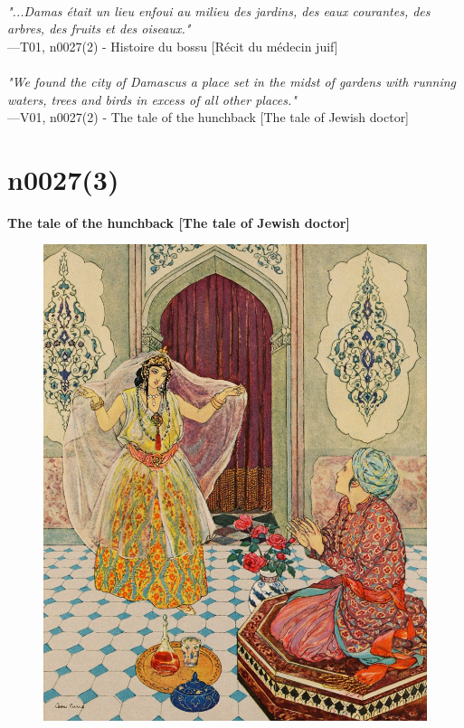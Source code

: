 \documentclass[../Carre_nights.tex]{subfiles}
\begin{document}
\textit{\\
"...Damas était un lieu enfoui au milieu des jardins, des eaux courantes, des arbres, des fruits et des oiseaux."} \\
—T01, n0027(2) - Histoire du bossu [Récit du médecin juif] \\~\\
\textit{"We found the city of Damascus a place set in the midst of gardens with running waters, trees and birds in excess of all other places."} \\
—V01, n0027(2) - The tale of the hunchback [The tale of Jewish doctor]

\newpage

\section{n0027(3)}
\textbf{\Large{The tale of the hunchback [The tale of Jewish doctor]}} \\

\begin{figure}[ht]
\centering
\includegraphics[height=\figsize]{illustrations/volume_1/T01, n0027(3) - Histoire du bossu [Récit du médecin juif].jpg}
\end{figure}
\end{document}
